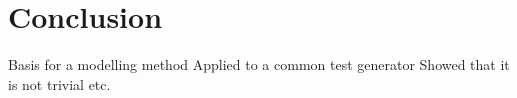 \section{Conclusion}

Basis for a modelling method
Applied to a common test generator
Showed that it is not trivial
etc.
